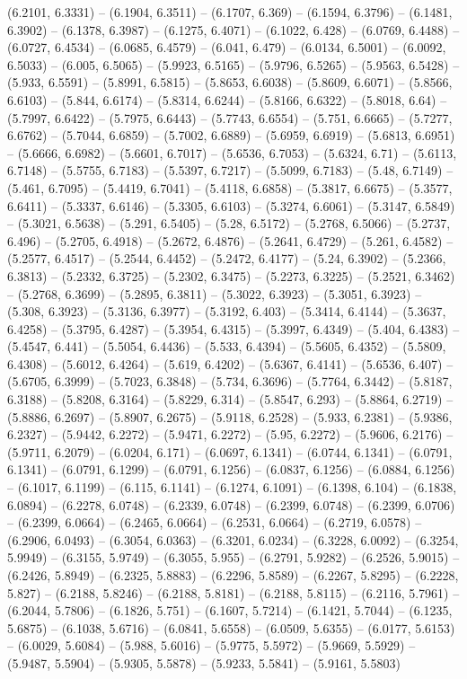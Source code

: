 (6.2101, 6.3331) -- (6.1904, 6.3511) -- (6.1707, 6.369) -- (6.1594, 6.3796) -- (6.1481, 6.3902) -- (6.1378, 6.3987) -- (6.1275, 6.4071) -- (6.1022, 6.428) -- (6.0769, 6.4488) -- (6.0727, 6.4534) -- (6.0685, 6.4579) -- (6.041, 6.479) -- (6.0134, 6.5001) -- (6.0092, 6.5033) -- (6.005, 6.5065) -- (5.9923, 6.5165) -- (5.9796, 6.5265) -- (5.9563, 6.5428) -- (5.933, 6.5591) -- (5.8991, 6.5815) -- (5.8653, 6.6038) -- (5.8609, 6.6071) -- (5.8566, 6.6103) -- (5.844, 6.6174) -- (5.8314, 6.6244) -- (5.8166, 6.6322) -- (5.8018, 6.64) -- (5.7997, 6.6422) -- (5.7975, 6.6443) -- (5.7743, 6.6554) -- (5.751, 6.6665) -- (5.7277, 6.6762) -- (5.7044, 6.6859) -- (5.7002, 6.6889) -- (5.6959, 6.6919) -- (5.6813, 6.6951) -- (5.6666, 6.6982) -- (5.6601, 6.7017) -- (5.6536, 6.7053) -- (5.6324, 6.71) -- (5.6113, 6.7148) -- (5.5755, 6.7183) -- (5.5397, 6.7217) -- (5.5099, 6.7183) -- (5.48, 6.7149) -- (5.461, 6.7095) -- (5.4419, 6.7041) -- (5.4118, 6.6858) -- (5.3817, 6.6675) -- (5.3577, 6.6411) -- (5.3337, 6.6146) -- (5.3305, 6.6103) -- (5.3274, 6.6061) -- (5.3147, 6.5849) -- (5.3021, 6.5638) -- (5.291, 6.5405) -- (5.28, 6.5172) -- (5.2768, 6.5066) -- (5.2737, 6.496) -- (5.2705, 6.4918) -- (5.2672, 6.4876) -- (5.2641, 6.4729) -- (5.261, 6.4582) -- (5.2577, 6.4517) -- (5.2544, 6.4452) -- (5.2472, 6.4177) -- (5.24, 6.3902) -- (5.2366, 6.3813) -- (5.2332, 6.3725) -- (5.2302, 6.3475) -- (5.2273, 6.3225) -- (5.2521, 6.3462) -- (5.2768, 6.3699) -- (5.2895, 6.3811) -- (5.3022, 6.3923) -- (5.3051, 6.3923) -- (5.308, 6.3923) -- (5.3136, 6.3977) -- (5.3192, 6.403) -- (5.3414, 6.4144) -- (5.3637, 6.4258) -- (5.3795, 6.4287) -- (5.3954, 6.4315) -- (5.3997, 6.4349) -- (5.404, 6.4383) -- (5.4547, 6.441) -- (5.5054, 6.4436) -- (5.533, 6.4394) -- (5.5605, 6.4352) -- (5.5809, 6.4308) -- (5.6012, 6.4264) -- (5.619, 6.4202) -- (5.6367, 6.4141) -- (5.6536, 6.407) -- (5.6705, 6.3999) -- (5.7023, 6.3848) -- (5.734, 6.3696) -- (5.7764, 6.3442) -- (5.8187, 6.3188) -- (5.8208, 6.3164) -- (5.8229, 6.314) -- (5.8547, 6.293) -- (5.8864, 6.2719) -- (5.8886, 6.2697) -- (5.8907, 6.2675) -- (5.9118, 6.2528) -- (5.933, 6.2381) -- (5.9386, 6.2327) -- (5.9442, 6.2272) -- (5.9471, 6.2272) -- (5.95, 6.2272) -- (5.9606, 6.2176) -- (5.9711, 6.2079) -- (6.0204, 6.171) -- (6.0697, 6.1341) -- (6.0744, 6.1341) -- (6.0791, 6.1341) -- (6.0791, 6.1299) -- (6.0791, 6.1256) -- (6.0837, 6.1256) -- (6.0884, 6.1256) -- (6.1017, 6.1199) -- (6.115, 6.1141) -- (6.1274, 6.1091) -- (6.1398, 6.104) -- (6.1838, 6.0894) -- (6.2278, 6.0748) -- (6.2339, 6.0748) -- (6.2399, 6.0748) -- (6.2399, 6.0706) -- (6.2399, 6.0664) -- (6.2465, 6.0664) -- (6.2531, 6.0664) -- (6.2719, 6.0578) -- (6.2906, 6.0493) -- (6.3054, 6.0363) -- (6.3201, 6.0234) -- (6.3228, 6.0092) -- (6.3254, 5.9949) -- (6.3155, 5.9749) -- (6.3055, 5.955) -- (6.2791, 5.9282) -- (6.2526, 5.9015) -- (6.2426, 5.8949) -- (6.2325, 5.8883) -- (6.2296, 5.8589) -- (6.2267, 5.8295) -- (6.2228, 5.827) -- (6.2188, 5.8246) -- (6.2188, 5.8181) -- (6.2188, 5.8115) -- (6.2116, 5.7961) -- (6.2044, 5.7806) -- (6.1826, 5.751) -- (6.1607, 5.7214) -- (6.1421, 5.7044) -- (6.1235, 5.6875) -- (6.1038, 5.6716) -- (6.0841, 5.6558) -- (6.0509, 5.6355) -- (6.0177, 5.6153) -- (6.0029, 5.6084) -- (5.988, 5.6016) -- (5.9775, 5.5972) -- (5.9669, 5.5929) -- (5.9487, 5.5904) -- (5.9305, 5.5878) -- (5.9233, 5.5841) -- (5.9161, 5.5803) 